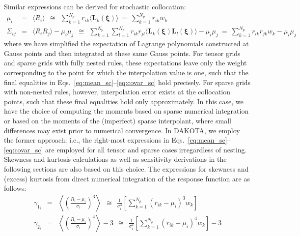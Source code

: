 Similar expressions can be derived for stochastic collocation:
\begin{eqnarray}
\mu_i      &=& \langle R_i \rangle ~~\cong~~ \sum_{k=1}^{N_p} r_{ik} \langle 
\boldsymbol{L}_k(\boldsymbol{\xi}) \rangle ~=~ \sum_{k=1}^{N_p} r_{ik} w_k 
\label{eq:mean_sc} \\
\Sigma_{ij} &=& \langle R_i R_j \rangle - \mu_i \mu_j
~~\cong~~ \sum_{k=1}^{N_p} \sum_{l=1}^{N_p} r_{ik} r_{jl} \langle
\boldsymbol{L}_k(\boldsymbol{\xi}) \boldsymbol{L}_l(\boldsymbol{\xi}) \rangle
- \mu_i \mu_j ~=~ \sum_{k=1}^{N_p} r_{ik} r_{jk} w_k - \mu_i \mu_j~~~~~~~~~ \label{eq:covar_sc} 
\end{eqnarray}
where we have simplified the expectation of Lagrange polynomials
constructed at Gauss points and then integrated at these same Gauss
points.  For tensor grids and sparse grids with fully nested rules,
these expectations leave only the weight corresponding to the point
for which the interpolation value is one, such that the final
equalities in Eqs.~\ref{eq:mean_sc}--\ref{eq:covar_sc} hold precisely.
For sparse grids with non-nested rules, however, interpolation error
exists at the collocation points, such that these final equalities
hold only approximately.  In this case, we have the choice of
computing the moments based on sparse numerical integration or based
on the moments of the (imperfect) sparse interpolant, where small
differences may exist prior to numerical convergence.  In DAKOTA, we
employ the former approach; i.e., the right-most expressions in
Eqs.~\ref{eq:mean_sc}--\ref{eq:covar_sc} are employed for all tensor
and sparse cases irregardless of nesting.  Skewness and kurtosis
calculations as well as sensitivity derivations in the following
sections are also based on this choice.
The expressions for skewness and (excess) kurtosis from direct numerical 
integration of the response function are as follows:
\begin{eqnarray}
\gamma_{1_i} &=& \left\langle \left(\frac{R_i - \mu_i}{\sigma_i}\right)^3 \right\rangle
~~\cong~~ \frac{1}{\sigma_i^3} \left[ \sum_{k=1}^{N_p} (r_{ik}-\mu_i)^3 w_k \right] \label{eq:skewness} \\
\gamma_{2_i} &=& \left\langle \left(\frac{R_i - \mu_i}{\sigma_i}\right)^4 \right\rangle - 3 
~~\cong~~ \frac{1}{\sigma_i^4} \left[ \sum_{k=1}^{N_p} (r_{ik}-\mu_i)^4 w_k \right] - 3\label{eq:kurtosis} 
\end{eqnarray}


